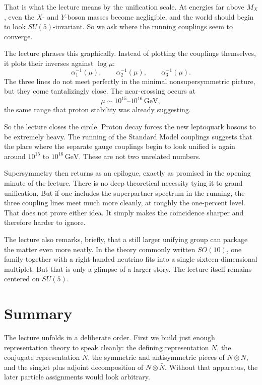 That is what the lecture means by the unification scale. At energies far above \(M_X\), even the \(X\)- and \(Y\)-boson masses become negligible, and the world should begin to look \(SU(5)\)-invariant. So we ask where the running couplings seem to converge.

The lecture phrases this graphically. Instead of plotting the couplings themselves, it plots their inverses against \(\log \mu\):
\begin{equation}
\alpha_1^{-1}(\mu),\qquad \alpha_2^{-1}(\mu),\qquad \alpha_3^{-1}(\mu).
\end{equation}
The three lines do not meet perfectly in the minimal nonsupersymmetric picture, but they come tantalizingly close. The near-crossing occurs at
\begin{equation}
\mu \sim 10^{15}\text{--}10^{16}\,\mathrm{GeV},
\end{equation}
the same range that proton stability was already suggesting.

So the lecture closes the circle. Proton decay forces the new leptoquark bosons to be extremely heavy. The running of the Standard Model couplings suggests that the place where the separate gauge couplings begin to look unified is again around \(10^{15}\) to \(10^{16}\,\mathrm{GeV}\). These are not two unrelated numbers.

Supersymmetry then returns as an epilogue, exactly as promised in the opening minute of the lecture. There is no deep theoretical necessity tying it to grand unification. But if one includes the superpartner spectrum in the running, the three coupling lines meet much more cleanly, at roughly the one-percent level. That does not prove either idea. It simply makes the coincidence sharper and therefore harder to ignore.

The lecture also remarks, briefly, that a still larger unifying group can package the matter even more neatly. In the theory commonly written \(SO(10)\), one family together with a right-handed neutrino fits into a single sixteen-dimensional multiplet. But that is only a glimpse of a larger story. The lecture itself remains centered on \(SU(5)\).

\section{Summary}

The lecture unfolds in a deliberate order. First we build just enough representation theory to speak cleanly: the defining representation \(N\), the conjugate representation \(\bar N\), the symmetric and antisymmetric pieces of \(N\otimes N\), and the singlet plus adjoint decomposition of \(N\otimes \bar N\). Without that apparatus, the later particle assignments would look arbitrary.

